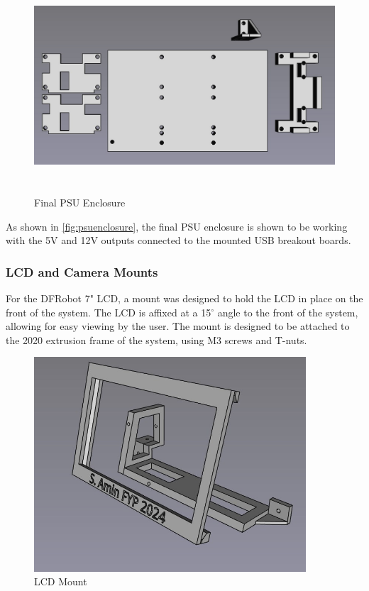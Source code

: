 \begin{figure}[H]
    \begin{minipage}[h]{0.95\textwidth}
        \centering
        \includegraphics[height=8cm]{imgs/freecad/psu_mount.jpg}
        \caption{Final PSU Enclosure}
        \label{fig:psuenclosure}
    \end{minipage}
\end{figure}

As shown in \autoref{fig:psuenclosure}, the final PSU enclosure is shown to be working with the 5V and 12V outputs connected to the mounted USB breakout boards.

\subsubsection{LCD and Camera Mounts}
\label{sec:lcd-mount}
For the DFRobot 7" LCD, a mount was designed to hold the LCD in place on the front of the system. The LCD is affixed at a 15$^{\circ}$ angle to the front of the system, allowing for easy viewing by the user. The mount is designed to be attached to the 2020 extrusion frame of the system, using M3 screws and T-nuts.


\begin{figure}[H]
    \begin{minipage}[h]{0.95\textwidth}
        \centering
        \includegraphics[height=8cm]{imgs/freecad/lcd_mount2.jpg}
        \caption{LCD Mount}
        \label{fig:lcdmount}
    \end{minipage}
\end{figure}

